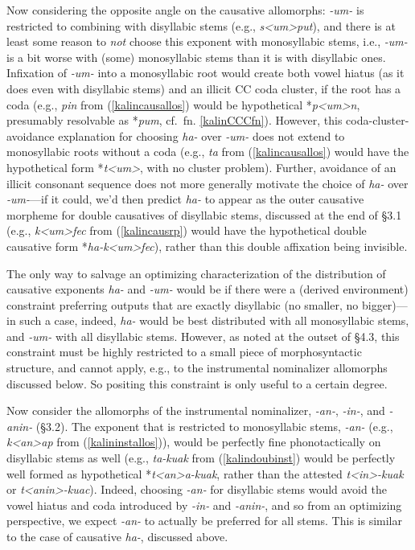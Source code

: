 \documentclass[output=paper,colorlinks,citecolor=brown,
]{langscibook}
\begin{document}
Now considering the opposite angle on the causative allomorphs: \textit{-um-} is restricted to combining with disyllabic stems (e.g., \textit{s<um>put}), and there is at least some reason to {\it not} choose this exponent with monosyllabic stems, i.e., \textit{-um-} is a bit worse with (some) monosyllabic stems than it is with disyllabic ones. Infixation of \textit{-um-} into a monosyllabic root would create both vowel hiatus (as it does even with disyllabic stems) and an illicit CC coda cluster, if the root has a coda (e.g., \textit{pin} from (\ref{kalincausallos}) would be hypothetical *\textit{p<um>n}, presumably resolvable as *\textit{pum}, cf.\ fn. \ref{kalinCCCfn}). However, this coda-cluster-avoidance explanation for choosing \textit{ha-} over \textit{-um-} does not extend to monosyllabic roots without a coda (e.g., \textit{ta} from (\ref{kalincausallos}) would have the hypothetical form *\textit{t<um>}, with no cluster problem). Further, avoidance of an illicit consonant sequence does not more generally motivate the choice of \textit{ha-} over \textit{-um-}---if it could, we'd then predict \textit{ha-} to appear as the outer causative morpheme for double causatives of disyllabic stems, discussed at the end of \S3.1 (e.g., \textit{k<um>fec} from (\ref{kalincausrp}) would have the hypothetical double causative form *\textit{ha-k<um>fec}), rather than this double affixation being invisible.

The only way to salvage an optimizing characterization of the distribution of causative exponents \textit{ha-} and \textit{-um-} would be if there were a (derived environment) constraint preferring outputs that are exactly disyllabic (no smaller, no bigger)---in such a case, indeed, \textit{ha-} would be best distributed with all monosyllabic stems, and \textit{-um-} with all disyllabic stems. However, as noted at the outset of \S4.3, this constraint must be highly restricted to a small piece of morphosyntactic structure, and cannot apply, e.g., to the instrumental nominalizer allomorphs discussed below. So positing this constraint is only useful to a certain degree.

Now consider the allomorphs of the instrumental nominalizer, \textit{-an-}, \textit{-in-}, and \textit{-anin-} (\S3.2). The exponent that is restricted to monosyllabic stems, \textit{-an-} (e.g., \textit{k<an>ap} from (\ref{kalininstallos})), would be perfectly fine phonotactically on disyllabic stems as well (e.g., \textit{ta-kuak} from (\ref{kalindoubinst}) would be perfectly well formed as hypothetical *\textit{t<an>a-kuak}, rather than the attested \textit{t<in>-kuak} or \textit{t<anin>-kuac}). Indeed, choosing \textit{-an-} for disyllabic stems would avoid the vowel hiatus and coda introduced by \textit{-in-} and \textit{-anin-}, and so from an optimizing perspective, we expect \textit{-an-} to actually be preferred for all stems. This is similar to the case of causative \textit{ha-}, discussed above.
\end{document}
